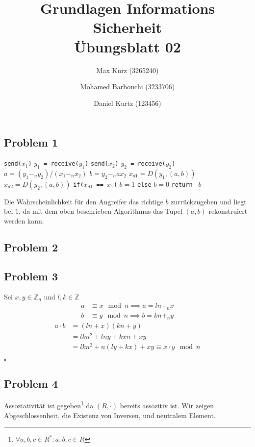 \documentclass[12pt, german]{article}
\title{Grundlagen Informations Sicherheit \\ Übungsblatt 02}
\author{Max Kurz (3265240)  \and Mohamed Barbouchi (3233706) \and Daniel Kurtz (123456)}
\date{}
\newcommand{\bewiesen}{\begin{flushright}$\square$ \end{flushright} }
\begin{document}
	\maketitle
    \subsection*{Problem 1}
   	\begin{algorithm} 
    		\centering
    		\caption{$D(Y)$}
    		\label{Alg:1}
    		\begin{algorithmic}[1]
    			\State \texttt{send($x_1$)}  
    			\State \texttt{$y_1$ = receive($y_1$)}
    			\State \texttt{send($x_2$)}  
    			\State \texttt{$y_2$ = receive($y_2$)}
    			\State  $a= (y_1 -_n y_2)/(x_1 -_n x_2)$ 
    			\State $b=y_2 -_n ax_2$
    			\State $x_{d1}= D(y_1, (a,b))$
    			\State $x_{d2}= D(y_2, (a,b))$
    			\State  \texttt{if($x_{d1}$ == $x_1$)}{	$b = 1$ \texttt{else} $b = 0$ }
    			\State \texttt{return } $b$
    		\end{algorithmic}
    	\end{algorithm} 		
    Die Wahrscheinlichkeit für den Angreifer das richtige $b$ zurrückzugeben und liegt bei $1$, da mit dem oben beschrieben Algorithmus das Tupel $(a,b)$ rekonstruiert werden kann.
    
    \subsection*{Problem 2}
    
    \subsection*{Problem 3}
    	Sei  $x, y \in \mathbb{Z}_n$ und $l,k \in \mathbb{Z}$
    	\begin{align*}
    			a &\equiv x \mod n 	\implies	a = ln +_n x \\
    			b &\equiv y \mod n \implies 	b = kn +_n y
    	\end{align*}
    	\begin{align*}
    	a\cdot b &= (ln +x)(kn +y) \\
    	&=lkn^2 +lny +kxn + xy \\
    	&= lkn^2 +n(ly +kx) +xy \equiv x\cdot y \mod n
    	\end{align*}
    	\bewiesen
    
    
       \subsection*{Problem 4}
    	Assoziativität ist gegeben\footnote{$\forall a,b,c \in R^\ast : a,b,c \in R $} da $(R, \cdot)$ bereits assozitiv ist. Wir zeigen Abgeschlossenheit, die Existenz von Inversen, und neutralem Element. 
\end{document}

